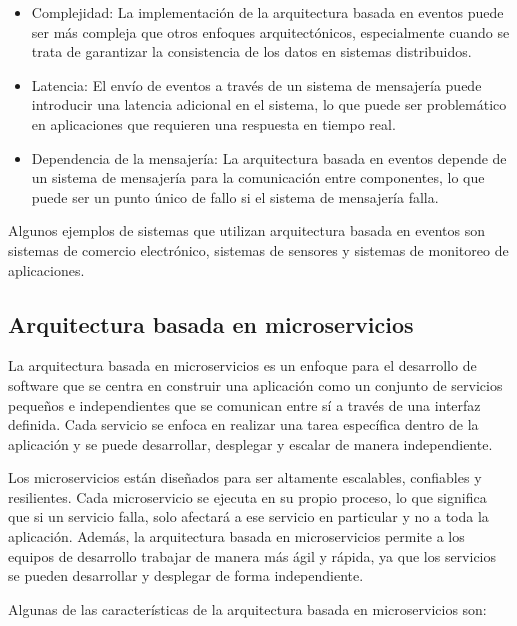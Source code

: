\documentclass[executivepaper]{article}
\begin{document}
\begin{itemize}
\item Complejidad: La implementación de la arquitectura basada en eventos puede ser más compleja que otros enfoques arquitectónicos, especialmente cuando se trata de garantizar la consistencia de los datos en sistemas distribuidos.
\item Latencia: El envío de eventos a través de un sistema de mensajería puede introducir una latencia adicional en el sistema, lo que puede ser problemático en aplicaciones que requieren una respuesta en tiempo real.
\item Dependencia de la mensajería: La arquitectura basada en eventos depende de un sistema de mensajería para la comunicación entre componentes, lo que puede ser un punto único de fallo si el sistema de mensajería falla.
\end{itemize}

Algunos ejemplos de sistemas que utilizan arquitectura basada en eventos son sistemas de comercio electrónico, sistemas de sensores y sistemas de monitoreo de aplicaciones.

\subsection{Arquitectura basada en microservicios}

La arquitectura basada en microservicios es un enfoque para el desarrollo de software que se centra en construir una aplicación como un conjunto de servicios pequeños e independientes que se comunican entre sí a través de una interfaz definida. Cada servicio se enfoca en realizar una tarea específica dentro de la aplicación y se puede desarrollar, desplegar y escalar de manera independiente.

Los microservicios están diseñados para ser altamente escalables, confiables y resilientes. Cada microservicio se ejecuta en su propio proceso, lo que significa que si un servicio falla, solo afectará a ese servicio en particular y no a toda la aplicación. Además, la arquitectura basada en microservicios permite a los equipos de desarrollo trabajar de manera más ágil y rápida, ya que los servicios se pueden desarrollar y desplegar de forma independiente.

Algunas de las características de la arquitectura basada en microservicios son:
\end{document}

